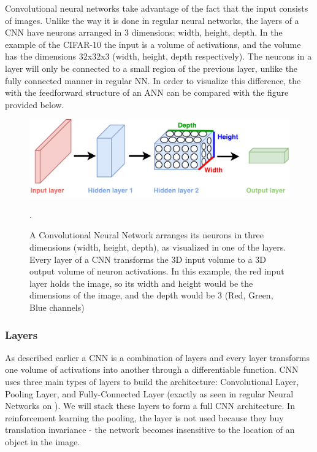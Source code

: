 Convolutional neural networks take advantage of the fact that the input consists of images. Unlike the way it is done in regular neural networks, the layers of a CNN have neurons arranged in 3 dimensions: width, height, depth. In the example of the CIFAR-10 \cite{CIFAR_10} the input is a volume of activations, and the volume has the dimensions 32x32x3 (width, height, depth respectively). The neurons in a layer will only be connected to a small region of the previous layer, unlike the fully connected manner in regular NN. In order to visualize this difference, the  with the feedforward structure of an ANN can be compared with the figure  provided below.


\begin{figure}[H]
	\centering
	\includegraphics[width=1\textwidth]{Figures/NN_vs_CNN.pdf}
	\caption{A Convolutional Neural Network arranges its neurons in three dimensions (width, height, depth), as visualized in one of the layers. Every layer of a CNN transforms the 3D input volume to a 3D output volume of neuron activations. In this example, the red input layer holds the image, so its width and height would be the dimensions of the image, and the depth would be 3 (Red, Green, Blue channels) \cite{CNN_course}}.
	\label{fig:NN_vs_CNN}
\end{figure}

\subsubsection{Layers}
As described earlier a CNN is a combination of layers and every layer transforms one volume of activations into another through a differentiable function. CNN uses three main types of layers to build the architecture: Convolutional Layer, Pooling Layer, and Fully-Connected Layer (exactly as seen in regular Neural Networks on ). We will stack these layers to form a full CNN architecture. In reinforcement learning the pooling, the layer is not used because they buy translation invariance - the network becomes insensitive to the location of an object in the image.

